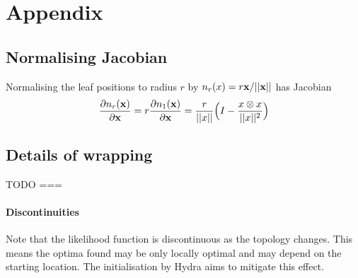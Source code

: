 \documentclass[11pt, twocolumn]{article}
\newcommand{\be}{\begin{equation*}}
\newcommand{\ee}{\end{equation*}}
\begin{document}
\clearpage
\section{Appendix}


\subsection{Normalising Jacobian}
Normalising the leaf positions to radius $r$ by $n_{r}(x) = r \bold{x}/||\bold{x}||$ has Jacobian
\be
\frac{\partial n_{r}(\bold{x})}{\partial \bold{x}} = r \frac{\partial n_{1}(\bold{x})}{\partial \bold{x}} = 
\dfrac{r}{||x||} \Big( I - \dfrac{x \otimes x}{||x||^{2}} \Big)
\ee

\subsection{Details of wrapping}
TODO ===

\paragraph{Discontinuities}
Note that the likelihood function is discontinuous as the topology changes.
This means the optima found may be only locally optimal and may depend on the starting location.
The initialisation by Hydra aims to mitigate this effect.

\end{document}
